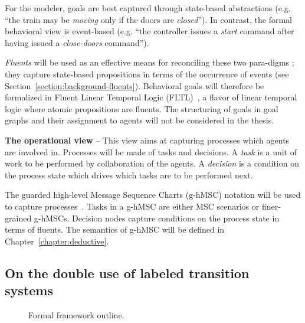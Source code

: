 For the modeler, goals are best captured through state-based abstractions (e.g. ``the train may be \emph{moving} only if the doors are \emph{closed}''). In contrast, the formal behavioral view is event-based (e.g. ``the controller issues a \emph{start} command after having issued a \emph{close-doors} command''). 

\emph{Fluents} will be used as an effective means for reconciling these two para-digms \cite{Miller:2002}; they capture state-based propositions in terms of the occurrence of events (see Section~\ref{section:background-fluents}). Behavioral goals will therefore be formalized in Fluent Linear Temporal Logic (FLTL)~\cite{Giannakopoulou:2003}, a flavor of linear temporal logic where atomic propositions are fluents. The structuring of goals in goal graphs and their assignment to agents will not be considered in the thesis.


\noindent \textbf{The operational view} -- This view aims at capturing processes which agents are involved in. Processes will be made of tasks and decisions. A \emph{task} is a unit of work to be performed by collaboration of the agents. A \emph{decision} is a condition on the process state which drives which tasks are to be performed next.

The guarded high-level Message Sequence Charts (g-hMSC) notation will be used to capture processes~\cite{Damas:2009, Damas:2011}. Tasks in a g-hMSC are either MSC scenarios or finer-grained g-hMSCs. Decision nodes capture conditions on the process state in terms of fluents. The semantics of g-hMSC will be defined in Chapter~\ref{chapter:deductive}.


\subsection{On the double use of labeled transition systems}

\begin{figure}[H]\centering
  \caption{Formal framework outline.\label{image:framework}}
\end{figure}

